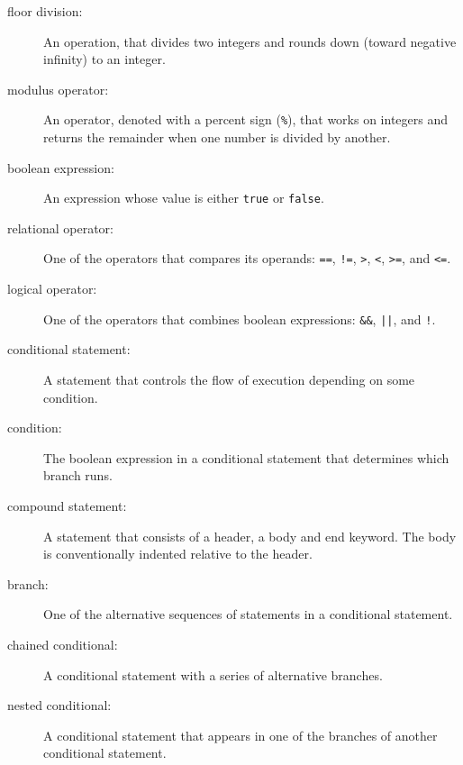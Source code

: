 \documentclass[10pt]{book}
\begin{document}
\begin{description}

\item[floor division:] An operation, that divides two
  integers and rounds down (toward negative infinity) to an integer.

\item[modulus operator:]  An operator, denoted with a percent sign
({\tt \%}), that works on integers and returns the remainder when one
number is divided by another.

\item[boolean expression:]  An expression whose value is either 
{\tt true} or {\tt false}.

\item[relational operator:] One of the operators that compares
its operands: {\tt ==}, {\tt !=}, {\tt >}, {\tt <}, {\tt >=}, and {\tt <=}.

\item[logical operator:] One of the operators that combines boolean
expressions: {\tt \&\&}, {\tt ||}, and {\tt !}.

\item[conditional statement:]  A statement that controls the flow of
execution depending on some condition.

\item[condition:] The boolean expression in a conditional statement
that determines which branch runs.

\item[compound statement:]  A statement that consists of a header,
a body and end keyword.  The body is conventionally indented
relative to the header.

\item[branch:] One of the alternative sequences of statements in
a conditional statement.

\item[chained conditional:]  A conditional statement with a series
of alternative branches.

\item[nested conditional:]  A conditional statement that appears
in one of the branches of another conditional statement.


\end{description}
\end{document}
